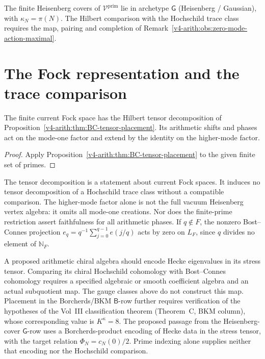 \begin{corollary}
\label{v4-arith:cor:placement-G-archetype}
The finite Heisenberg covers of
\(\mathcal{V}^{\mathrm{prim}}\) lie in archetype \(\mathsf{G}\)
(Heisenberg / Gaussian), with \(\kappa_{N}=\pi(N)\). The Hilbert comparison with the Hochschild trace class
requires the map, pairing and completion of
Remark~\ref{v4-arith:obs:zero-mode-action-maximal}.
\end{corollary}

\section{The Fock representation and the trace comparison}
\label{v4-arith:cs:correct-identification}

\begin{corollary}
\label{v4-arith:thm:CS-corrected-placement}

The finite current Fock space has the Hilbert tensor decomposition
of Proposition~\ref{v4-arith:thm:BC-tensor-placement}.
Its arithmetic shifts and phases act on the mode-one factor and
extend by the identity on the higher-mode factor.
\end{corollary}
\begin{proof}
Apply Proposition~\ref{v4-arith:thm:BC-tensor-placement} to the given finite
set of primes.
\end{proof}

\begin{remark}
The tensor decomposition is a statement about current Fock spaces.
It induces no tensor decomposition of a Hochschild trace class
without a compatible comparison.
The higher-mode factor alone is not the full vacuum Heisenberg
vertex algebra: it omits all mode-one creations.
Nor does the finite-prime restriction assert faithfulness for all
arithmetic phases. If $q\notin F$, the nonzero Bost--Connes projection
$e_q=q^{-1}\sum_{j=0}^{q-1}e(j/q)$ acts by zero on $L_F$,
since $q$ divides no element of $\mathbb N_F$.
\end{remark}

\begin{remark}
A proposed arithmetic chiral algebra should encode Hecke eigenvalues
in its stress tensor. Comparing its chiral Hochschild cohomology with
Bost--Connes cohomology requires a specified algebraic or smooth
coefficient algebra and an actual subquotient map. The gauge classes
above do not construct this map.
Placement in the Borcherds/BKM \(\mathsf{B}\)-row further requires
verification of the hypotheses of the Vol~III classification theorem
(Theorem~C, BKM column), whose corresponding value is \(K^\kappa=8\).
The proposed passage from the Heisenberg-cover \(\mathsf{G}\)-row
uses a Borcherds-product encoding of Hecke data in the stress tensor,
with the target relation \(\Phi_N=c_N(0)/2\). Prime indexing alone
supplies neither that encoding nor the Hochschild comparison.
\end{remark}

